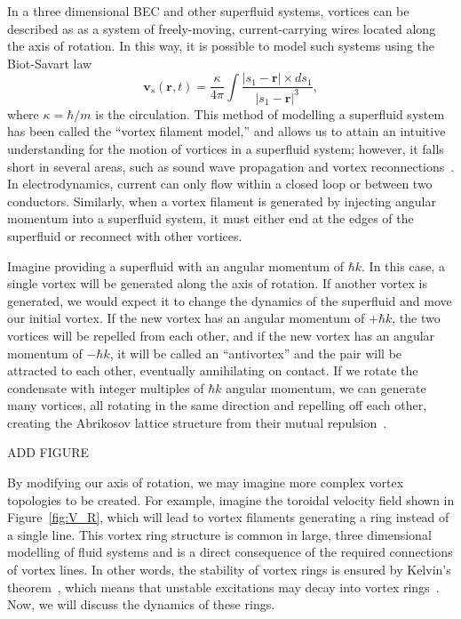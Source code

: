 In a three dimensional BEC and other superfluid systems, vortices can be described as as a system of freely-moving, current-carrying wires located along the axis of rotation. 
In this way, it is possible to model such systems using the Biot-Savart law ~\cite{Schwarz1985}
\begin{equation}
    \boldsymbol{v}_s(\boldsymbol{r},t) = \frac{\kappa}{4\pi}\int\frac{|s_1-\boldsymbol{r}|\times ds_1}{|s_1-\boldsymbol{r}|^3},
\label{eqn:BS}
\end{equation}
where $\kappa = \hbar / m$ is the circulation. 
This method of modelling a superfluid system has been called the ``vortex filament model,'' and allows us to attain an intuitive understanding for the motion of vortices in a superfluid system; however, it falls short in several areas, such as sound wave propagation and vortex reconnections~\cite{Zuccher2012}. 
In electrodynamics, current can only flow within a closed loop or between two conductors.
Similarly, when a vortex filament is generated by injecting angular momentum into a superfluid system, it must either end at the edges of the superfluid or reconnect with other vortices.

Imagine providing a superfluid with an angular momentum of $\hbar k$.
In this case, a single vortex will be generated along the axis of rotation.
If another vortex is generated, we would expect it to change the dynamics of the superfluid and move our initial vortex.
If the new vortex has an angular momentum of $+\hbar k$, the two vortices will be repelled from each other, and if the new vortex has an angular momentum of  $-\hbar k$, it will be called an ``antivortex'' and the pair will be attracted to each other, eventually annihilating on contact.
If we rotate the condensate with integer multiples of $\hbar k$ angular momentum, we can generate many vortices, all rotating in the same direction and repelling off each other, creating the Abrikosov lattice structure from their mutual repulsion~\cite{Fetter2010}.

ADD FIGURE

By modifying our axis of rotation, we may imagine more complex vortex topologies to be created. 
For example, imagine the toroidal velocity field shown in Figure~\ref{fig:V_R}, which will lead to  vortex filaments generating a ring instead of a single line. 
This vortex ring structure is common in large, three dimensional modelling of fluid systems and is a direct consequence of the required connections of vortex lines.
In other words, the stability of vortex rings is ensured by Kelvin's theorem~\cite{Donnelly1991}, which means that unstable excitations may decay into vortex rings~\cite{Anderson2001}.
Now, we will discuss the dynamics of these rings.

